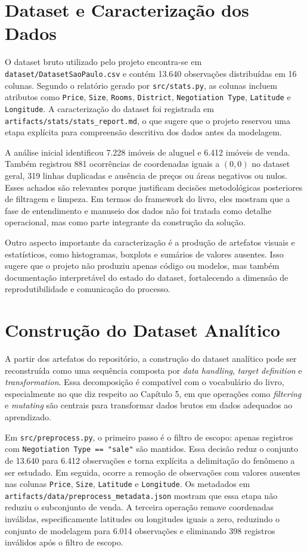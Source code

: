 \documentclass[12pt]{report}
\begin{document}
\chapter{Dataset e Caracterização dos Dados}

O dataset bruto utilizado pelo projeto encontra-se em \texttt{dataset/DatasetSaoPaulo.csv} e contém 13.640 observações distribuídas em 16 colunas. Segundo o relatório gerado por \texttt{src/stats.py}, as colunas incluem atributos como \texttt{Price}, \texttt{Size}, \texttt{Rooms}, \texttt{District}, \texttt{Negotiation Type}, \texttt{Latitude} e \texttt{Longitude}. A caracterização do dataset foi registrada em \texttt{artifacts/stats/stats\_report.md}, o que sugere que o projeto reservou uma etapa explícita para compreensão descritiva dos dados antes da modelagem.

A análise inicial identificou 7.228 imóveis de aluguel e 6.412 imóveis de venda. Também registrou 881 ocorrências de coordenadas iguais a $(0,0)$ no dataset geral, 319 linhas duplicadas e ausência de preços ou áreas negativos ou nulos. Esses achados são relevantes porque justificam decisões metodológicas posteriores de filtragem e limpeza. Em termos do framework do livro, eles mostram que a fase de entendimento e manuseio dos dados não foi tratada como detalhe operacional, mas como parte integrante da construção da solução.

Outro aspecto importante da caracterização é a produção de artefatos visuais e estatísticos, como histogramas, boxplots e sumários de valores ausentes. Isso sugere que o projeto não produziu apenas código ou modelos, mas também documentação interpretável do estado do dataset, fortalecendo a dimensão de reprodutibilidade e comunicação do processo.

\chapter{Construção do Dataset Analítico}

A partir dos artefatos do repositório, a construção do dataset analítico pode ser reconstruída como uma sequência composta por \textit{data handling}, \textit{target definition} e \textit{transformation}. Essa decomposição é compatível com o vocabulário do livro, especialmente no que diz respeito ao Capítulo 5, em que operações como \textit{filtering} e \textit{mutating} são centrais para transformar dados brutos em dados adequados ao aprendizado.

Em \texttt{src/preprocess.py}, o primeiro passo é o filtro de escopo: apenas registros com \texttt{Negotiation Type == "sale"} são mantidos. Essa decisão reduz o conjunto de 13.640 para 6.412 observações e torna explícita a delimitação do fenômeno a ser estudado. Em seguida, ocorre a remoção de observações com valores ausentes nas colunas \texttt{Price}, \texttt{Size}, \texttt{Latitude} e \texttt{Longitude}. Os metadados em \texttt{artifacts/data/preprocess\_metadata.json} mostram que essa etapa não reduziu o subconjunto de venda. A terceira operação remove coordenadas inválidas, especificamente latitudes ou longitudes iguais a zero, reduzindo o conjunto de modelagem para 6.014 observações e eliminando 398 registros inválidos após o filtro de escopo.
\end{document}
